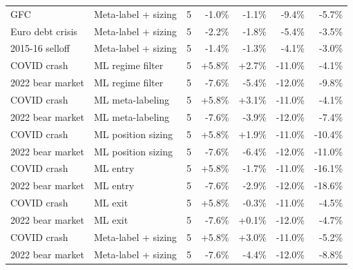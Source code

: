 \begin{longtable}{l l r r r r r}
GFC & Meta-label + sizing & 5 & -1.0\% & -1.1\% & -9.4\% & -5.7\% \\
Euro debt crisis & Meta-label + sizing & 5 & -2.2\% & -1.8\% & -5.4\% & -3.5\% \\
2015-16 selloff & Meta-label + sizing & 5 & -1.4\% & -1.3\% & -4.1\% & -3.0\% \\
COVID crash & ML regime filter & 5 & +5.8\% & +2.7\% & -11.0\% & -4.1\% \\
2022 bear market & ML regime filter & 5 & -7.6\% & -5.4\% & -12.0\% & -9.8\% \\
COVID crash & ML meta-labeling & 5 & +5.8\% & +3.1\% & -11.0\% & -4.1\% \\
2022 bear market & ML meta-labeling & 5 & -7.6\% & -3.9\% & -12.0\% & -7.4\% \\
COVID crash & ML position sizing & 5 & +5.8\% & +1.9\% & -11.0\% & -10.4\% \\
2022 bear market & ML position sizing & 5 & -7.6\% & -6.4\% & -12.0\% & -11.0\% \\
COVID crash & ML entry & 5 & +5.8\% & -1.7\% & -11.0\% & -16.1\% \\
2022 bear market & ML entry & 5 & -7.6\% & -2.9\% & -12.0\% & -18.6\% \\
COVID crash & ML exit & 5 & +5.8\% & -0.3\% & -11.0\% & -4.5\% \\
2022 bear market & ML exit & 5 & -7.6\% & +0.1\% & -12.0\% & -4.7\% \\
COVID crash & Meta-label + sizing & 5 & +5.8\% & +3.0\% & -11.0\% & -5.2\% \\
2022 bear market & Meta-label + sizing & 5 & -7.6\% & -4.4\% & -12.0\% & -8.8\% \\
\end{longtable}
